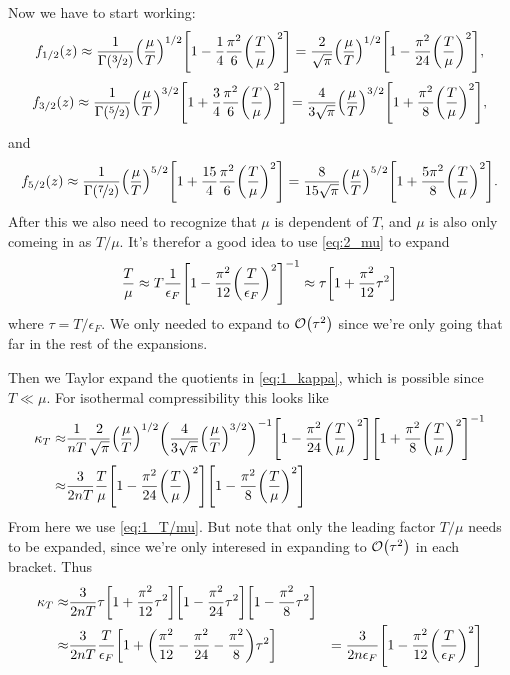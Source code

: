 \documentclass[11pt,letter, swedish, english
]{article}
\begin{document}
Now we have to start working:
\begin{equation}\label{eq:1_1/2}
f_{1/2}(z)\approx\frac{1}{\Gamma(\nicefrac{3}{2})}\qty(\frac{\mu}{T})^{1/2}
\qty[
1-\frac{1}{4}\frac{\pi^2}{6}\qty(\frac{T}{\mu})^2]
=\frac{2}{\sqrt{\pi}}\qty(\frac{\mu}{T})^{1/2}
\qty[
1-\frac{\pi^2}{24}\qty(\frac{T}{\mu})^2],
\end{equation}
\begin{equation}\label{eq:1_3/2}
f_{3/2}(z)\approx\frac{1}{\Gamma(\nicefrac{5}{2})}\qty(\frac{\mu}{T})^{3/2}
\qty[
1+\frac{3}{4}\frac{\pi^2}{6}\qty(\frac{T}{\mu})^2]
=\frac{4}{3\sqrt{\pi}}\qty(\frac{\mu}{T})^{3/2}
\qty[1+\frac{\pi^2}{8}\qty(\frac{T}{\mu})^2],
\end{equation}
and 
\begin{equation}\label{eq:1_5/2}
f_{5/2}(z)\approx\frac{1}{\Gamma(\nicefrac{7}{2})}\qty(\frac{\mu}{T})^{5/2}
\qty[
1+\frac{15}{4}\frac{\pi^2}{6}\qty(\frac{T}{\mu})^2]
=\frac{8}{15\sqrt{\pi}}\qty(\frac{\mu}{T})^{5/2}
\qty[1+\frac{5\pi^2}{8}\qty(\frac{T}{\mu})^2].
\end{equation}
After this we also need to recognize that $\mu$ is dependent of
$T$, and $\mu$ is also only comeing in as $T/\mu$. It's therefor a
good idea to use \eqref{eq:2_mu} to expand
\begin{equation}\label{eq:1_T/mu}
\frac{T}{\mu}\approx T \frac{1}{\epsilon_F}\qty[ 1
-\frac{\pi^2}{12}\qty(\frac{T}{\epsilon_F})^2]^{-1}
\approx\tau\qty[1
+\frac{\pi^2}{12}\tau^2]
\end{equation}
where $\tau=T/\epsilon_F$. We only needed to expand to
$\order{\tau^2}$ since we're only going that far in the rest of the
expansions. 

Then we Taylor expand the quotients in \eqref{eq:1_kappa},
which is possible since $T\ll\mu$. 
For isothermal compressibility this looks like
\begin{equation}
\begin{aligned}
\kappa_T\approx& \frac{1}{nT} 
\frac{2}{\sqrt{\pi}}\qty(\frac{\mu}{T})^{1/2}
\qty(\frac{4}{3\sqrt{\pi}}\qty(\frac{\mu}{T})^{3/2})^{-1}
\qty[
1-\frac{\pi^2}{24}\qty(\frac{T}{\mu})^2]
\qty[
1+\frac{\pi^2}{8}\qty(\frac{T}{\mu})^2]^{-1}\\
\approx&
 \frac{3}{2nT}\frac{T}{\mu}
\qty[
1-\frac{\pi^2}{24}\qty(\frac{T}{\mu})^2]
\qty[
1-\frac{\pi^2}{8}\qty(\frac{T}{\mu})^2]\\
\end{aligned}
\end{equation}
From here we use \eqref{eq:1_T/mu}. But note that only the leading
factor $T/\mu$ needs to be expanded, since we're only interesed in
expanding to $\order{\tau^2}$ in each bracket. Thus
\begin{equation}
\begin{aligned}
\kappa_T\approx& \frac{3}{2nT}
\tau\qty[1 +\frac{\pi^2}{12}\tau^2]
\qty[1 -\frac{\pi^2}{24}\tau^2]
\qty[1 -\frac{\pi^2}{8}\tau^2]\\
\approx& \frac{3}{2nT}
\frac{T}{\epsilon_F}\qty[1 +
\qty(\frac{\pi^2}{12}-\frac{\pi^2}{24}-\frac{\pi^2}{8})
\tau^2] 
&=\frac{3}{2n\epsilon_F}
\qty[1 - \frac{\pi^2}{12}\qty(\frac{T}{\epsilon_F})^2]
\end{aligned}
\end{equation}
\end{document}
